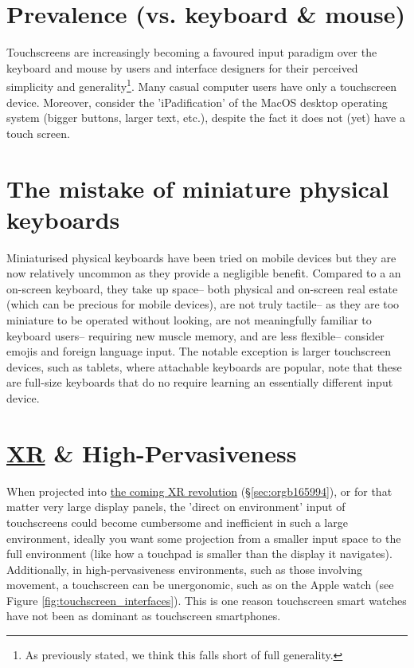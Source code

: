 \documentclass[logo,bsc,singlespacing,parskip]{infthesis}
\begin{document}
\section{Prevalence (vs. keyboard \& mouse)}
\label{sec:org6d663f8}
Touchscreens are increasingly becoming a favoured input paradigm over the keyboard and mouse by users and interface designers for their perceived simplicity and generality\footnote{As previously stated, we think this falls short of full generality.}.
Many casual computer users have only a touchscreen device.
Moreover, consider the 'iPadification' of the MacOS desktop operating system (bigger buttons, larger text, etc.), despite the fact it does not (yet) have a touch screen.

\section{The mistake of miniature physical keyboards}
\label{sec:org4b9bf3e}
Miniaturised physical keyboards have been tried on mobile devices but they are now relatively uncommon as they provide a negligible benefit.
Compared to a an on-screen keyboard, they take up space-- both physical and on-screen real estate (which can be precious for mobile devices), are not truly tactile-- as they are too miniature to be operated without looking, are not meaningfully familiar to keyboard users-- requiring new muscle memory, and are less flexible-- consider emojis and foreign language input.
The notable exception is larger touchscreen devices, such as tablets, where attachable keyboards are popular, note that these are full-size keyboards that do no require learning an essentially different input device.

\section{\hyperref[org39cbd51]{XR} \& High-Pervasiveness}
\label{sec:org994f37d}
When projected into \hyperref[sec:orgb165994]{the coming XR revolution} (\S \ref{sec:orgb165994}), or for that matter very large display panels, the 'direct on environment' input of touchscreens could become cumbersome and inefficient in such a large environment, ideally you want some projection from a smaller input space to the full environment (like how a touchpad is smaller than the display it navigates).
Additionally, in high-pervasiveness environments, such as those involving movement, a touchscreen can be unergonomic, such as on the Apple watch (see Figure \ref{fig:touchscreen_interfaces}).
This is one reason touchscreen smart watches have not been as dominant as touchscreen smartphones.
\end{document}
